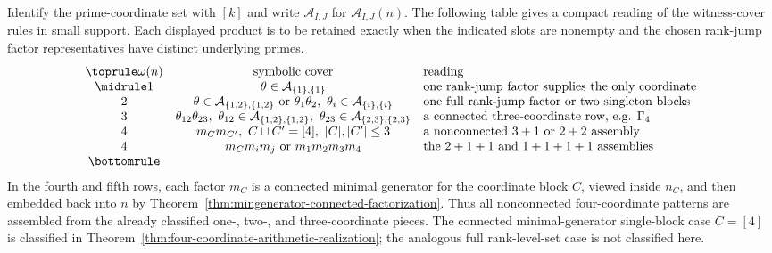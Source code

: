 \begin{example}
\label{ex:symbolic-support-patterns}
Identify the prime-coordinate set with $[k]$ and write
$\mathcal A_{I,J}$ for $\mathcal A_{I,J}(n)$. The following table gives a
compact reading of the witness-cover rules in small support. Each displayed
product is to be retained exactly when the indicated slots are nonempty and the
chosen rank-jump factor representatives have distinct underlying primes.
\[
\begin{array}{ccl}
\toprule
\omega(n) & \text{symbolic cover} & \text{reading}\\
\midrule
1 & \theta\in\mathcal A_{\{1\},\{1\}} &
\text{one rank-jump factor supplies the only coordinate}\\
2 & \theta\in\mathcal A_{\{1,2\},\{1,2\}}\ \text{or}\
\theta_1\theta_2,
\ \theta_i\in\mathcal A_{\{i\},\{i\}} &
\text{one full rank-jump factor or two singleton blocks}\\
3 & \theta_{12}\theta_{23},\
\theta_{12}\in\mathcal A_{\{1,2\},\{1,2\}},\
\theta_{23}\in\mathcal A_{\{2,3\},\{2,3\}} &
\text{a connected three-coordinate row, e.g. }\Gamma_4\\
4 & m_Cm_{C'},\ C\sqcup C'=[4],\ |C|,|C'|\le3 &
\text{a nonconnected }3+1\text{ or }2+2\text{ assembly}\\
4 & m_Cm_i m_j\ \text{or}\ m_1m_2m_3m_4 &
\text{the }2+1+1\text{ and }1+1+1+1\text{ assemblies}\\
\bottomrule
\end{array}
\]
In the fourth and fifth rows, each factor $m_C$ is a connected minimal
generator for the coordinate block $C$, viewed inside $n_C$, and then embedded
back into $n$ by Theorem~\ref{thm:mingenerator-connected-factorization}. Thus
all nonconnected four-coordinate patterns are assembled from the already
classified one-, two-, and three-coordinate pieces.  The connected
minimal-generator single-block case $C=[4]$ is classified in
Theorem~\ref{thm:four-coordinate-arithmetic-realization}; the analogous full
rank-level-set case is not classified here.
\end{example}

